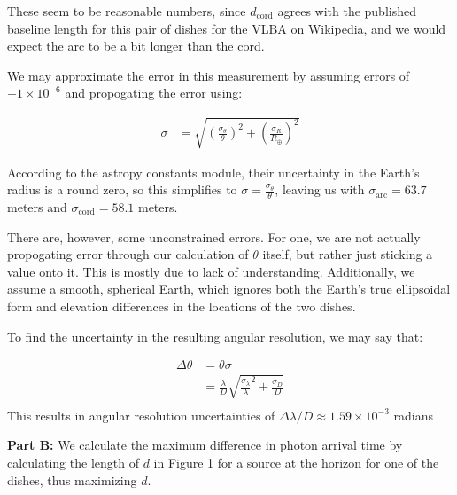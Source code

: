 \documentclass[12pt]{article}
\begin{document}
\begin{onehalfspacing}
These seem to be reasonable numbers, since $d_{\text{cord}}$ agrees with the published baseline length for this pair of dishes for the VLBA on Wikipedia, and we would expect the arc to be a bit longer than the cord. \bigskip

We may approximate the error in this measurement by assuming errors of $\pm 1 \times 10^{-6}$ and propogating the error using:

\begin{align*}
  \sigma &= \sqrt{ \left(\frac{\sigma_{\theta}}{\theta}\right)^2 + \left(\frac{\sigma_{R}}{R_{\oplus}}\right)^2}
\end{align*}

According to the astropy constants module, their uncertainty in the Earth's radius is a round zero, so this simplifies to $\sigma = \frac{\sigma_{\theta}}{\theta}$, leaving us with $\sigma_{\text{arc}} = 63.7$ meters and $\sigma_{\text{cord}} = 58.1$ meters. \bigskip

There are, however, some unconstrained errors. For one, we are not actually propogating error through our calculation of $\theta$ itself, but rather just sticking a value onto it. This is mostly due to lack of understanding. Additionally, we assume a smooth, spherical Earth, which ignores both the Earth's true ellipsoidal form and elevation differences in the locations of the two dishes.\bigskip

To find the uncertainty in the resulting angular resolution, we may say that:

\begin{align*}
  \Delta \theta &= \theta \sigma \\
                &= \frac{\lambda}{D} \sqrt{\frac{\sigma_{\lambda}}{\lambda}^2 + \frac{\sigma_{D}}{D}} \\
\end{align*}
This results in angular resolution uncertainties of $\Delta \lambda/D \approx 1.59 \times 10^{-3}$ radians

\bigskip
\raggedright{\textbf{\large Part B: }}
We calculate the maximum difference in photon arrival time by calculating the length of $d$ in Figure 1 for a source at the horizon for one of the dishes, thus maximizing $d$.\bigskip


\end{onehalfspacing}
\end{document}

